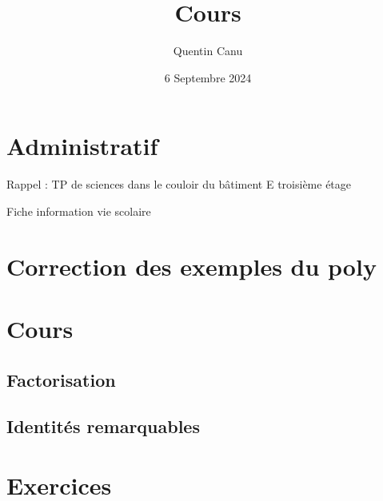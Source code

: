\documentclass{article}
\title{Cours}
\date{6 Septembre 2024}
\author{Quentin Canu}
\begin{document}
\maketitle
\section{Administratif}
Rappel : TP de sciences dans le couloir du bâtiment E troisième étage

Fiche information vie scolaire
\section{Correction des exemples du poly}
\section{Cours}
\subsection{Factorisation}
\subsection{Identités remarquables}
\section{Exercices}
\end{document}
